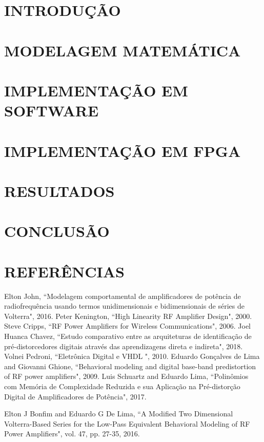 \documentclass[twocolumn, a4paper]{article}
\begin{document}
\section{INTRODUÇÃO}


\section{MODELAGEM MATEMÁTICA}


\section{IMPLEMENTAÇÃO EM SOFTWARE} \label{sec:implsoft}


\section{IMPLEMENTAÇÃO EM FPGA}


\section{RESULTADOS}


\section{CONCLUSÃO}


\section*{REFERÊNCIAS}
\begingroup
\renewcommand{\section}[2]{}%

\begin{thebibliography}{}
	 Elton John, ``Modelagem comportamental de amplificadores de potência de radiofrequência usando termos unidimensionais e bidimensionais de séries de Volterra", 2016.
	 Peter Kenington, ``High Linearity RF Amplifier Design", 2000.
	 Steve Cripps, ``RF Power Amplifiers for Wireless Communications", 2006.
	 Joel Huanca Chavez, ``Estudo comparativo entre as arquiteturas de identificação de pré-distorcedores digitais através das aprendizagens direta e indireta", 2018.
	 Volnei Pedroni, ``Eletrônica Digital e VHDL ", 2010.
	 Eduardo Gonçalves de Lima and Giovanni Ghione, ``Behavioral modeling and digital base-band predistortion of RF power amplifiers", 2009.
	 Luis Schuartz and Eduardo Lima, ``Polinômios com Memória de Complexidade Reduzida e sua Aplicação na Pré-distorção Digital de Amplificadores de Potência", 2017.
	
	 Elton J Bonfim and Eduardo G De Lima, ``A Modified Two Dimensional Volterra-Based Series for the Low-Pass Equivalent Behavioral Modeling of RF Power Amplifiers", vol. 47, pp. 27-35, 2016.
\end{thebibliography}




\endgroup
\end{document}
